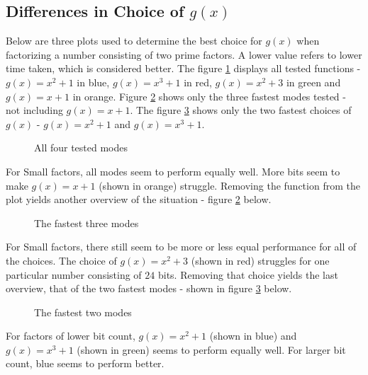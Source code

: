\subsection{Differences in Choice of $g(x)$}
Below are three plots used to determine the best choice for $g(x)$ when factorizing a number consisting of two prime factors. A lower value refers to lower time taken, which is considered better. The figure \ref{fig:pollardsAllModes} displays all tested functions - $g(x)=x^2+1$ in blue, $g(x)=x^3+1$ in red, $g(x)=x^2+3$ in green and $g(x)=x+1$ in orange. Figure \ref{fig:pollardsFasterModes} shows only the three fastest modes tested - not including $g(x)=x+1$. The figure \ref{fig:pollardsFastestModes} shows only the two fastest choices of $g(x)$ - $g(x)=x^2+1$ and $g(x)=x^3+1$.

\begin{figure}[H]
    \centering
    
    \vspace{-0.3cm}
    \caption{All four tested modes}\label{fig:pollardsAllModes}
\end{figure}

For Small factors, all modes seem to perform equally well. More bits seem to make $g(x)=x+1$ (shown in orange) struggle. Removing the function from the plot yields another overview of the situation - figure \ref{fig:pollardsFasterModes} below.

\begin{figure}[H]
    \centering
    
    \vspace{-0.3cm}
    \caption{The fastest three modes}\label{fig:pollardsFasterModes}
\end{figure}

For Small factors, there still seem to be more or less equal performance for all of the choices. The choice of $g(x)=x^2+3$ (shown in red) struggles for one particular number consisting of $24$ bits. Removing that choice yields the last overview, that of the two fastest modes - shown in figure \ref{fig:pollardsFastestModes} below.

\begin{figure}[H]
    \centering
    
    \vspace{-0.3cm}
    \caption{The fastest two modes}\label{fig:pollardsFastestModes}
\end{figure}

For factors of lower bit count, $g(x)=x^2+1$ (shown in blue) and $g(x)=x^3+1$ (shown in green) seems to perform equally well. For larger bit count, blue seems to perform better.

